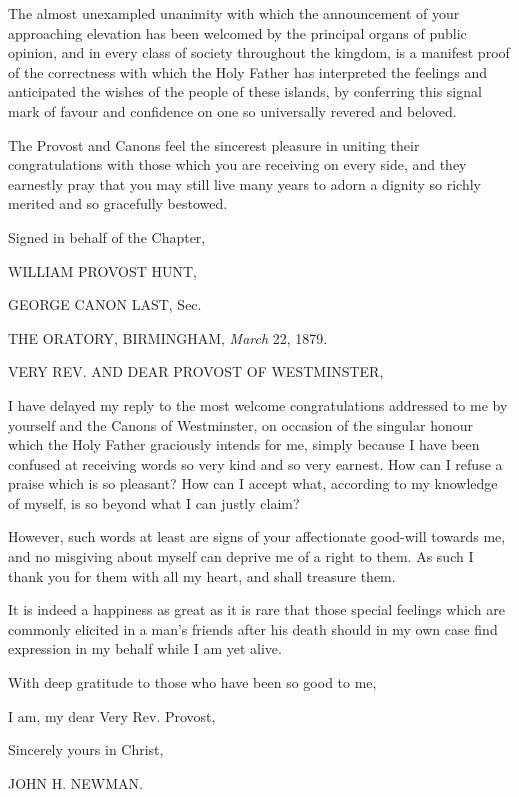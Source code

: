 The almost unexampled unanimity with which the announcement of your
approaching elevation has been welcomed by the principal organs of
public opinion, and in every class of society throughout the kingdom,
is a manifest proof of the correctness with which the Holy Father has
interpreted the feelings and anticipated the wishes of the people of
these islands, by conferring this signal mark of favour and confidence
on one so universally revered and beloved.

The Provost and Canons feel the sincerest pleasure in uniting their
congratulations with those which you are receiving on every side, and
they earnestly pray that you may still live many years to adorn a
dignity so richly merited and so gracefully bestowed.

Signed in behalf of the Chapter,

WILLIAM PROVOST HUNT,

GEORGE CANON LAST,
Sec.


THE ORATORY, BIRMINGHAM,
\emph{March} 22, 1879.

VERY REV. AND
DEAR PROVOST OF
WESTMINSTER,

I have delayed my reply to the most welcome congratulations addressed
to me by yourself and the Canons of Westminster, on occasion of
the singular honour which the Holy Father graciously intends for me,
simply because I have been confused at receiving words so very kind
and so very earnest. How can I refuse a praise which is so pleasant?
How can I accept what, according to my knowledge of myself, is so
beyond what I can justly claim?

However, such words at least are signs of your affectionate
good-will towards me, and no misgiving about myself can deprive me of
a right to them. As such I thank you for them with all my heart, and
shall treasure them.

It is indeed a happiness as great as it is rare that those special
feelings which are commonly elicited in a man's friends after his
death should in my own case find expression in my behalf while I am
yet alive.

With deep gratitude to those who have been so good to me,

I am, my dear Very Rev. Provost,

Sincerely yours in Christ,

JOHN H. NEWMAN.


